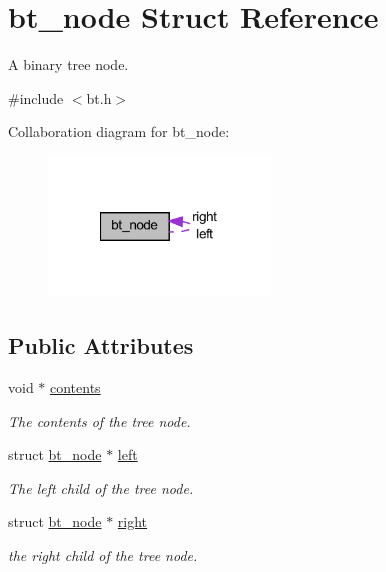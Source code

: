 \hypertarget{structbt__node}{
\section{bt\_\-node Struct Reference}
\label{structbt__node}
}


A binary tree node.  




{\ttfamily \#include $<$bt.h$>$}



Collaboration diagram for bt\_\-node:\nopagebreak
\begin{figure}[H]
\begin{center}
\leavevmode
\includegraphics[width=167pt]{structbt__node__coll__graph}
\end{center}
\end{figure}
\subsection*{Public Attributes}
\begin{DoxyCompactItemize}
\item 
void $\ast$ \hyperlink{structbt__node_a9e0d7c8bb9ca7bb4b69bd4af9ca1440c}{contents}
\begin{DoxyCompactList}\small\item\em The contents of the tree node. \item\end{DoxyCompactList}\item 
struct \hyperlink{structbt__node}{bt\_\-node} $\ast$ \hyperlink{structbt__node_a689e6fb3fde56bc337d5234b0d7f8e80}{left}
\begin{DoxyCompactList}\small\item\em The left child of the tree node. \item\end{DoxyCompactList}\item 
struct \hyperlink{structbt__node}{bt\_\-node} $\ast$ \hyperlink{structbt__node_aefe84db5b1f24953aba4743200b24898}{right}
\begin{DoxyCompactList}\small\item\em the right child of the tree node. \item\end{DoxyCompactList}\end{DoxyCompactItemize}


